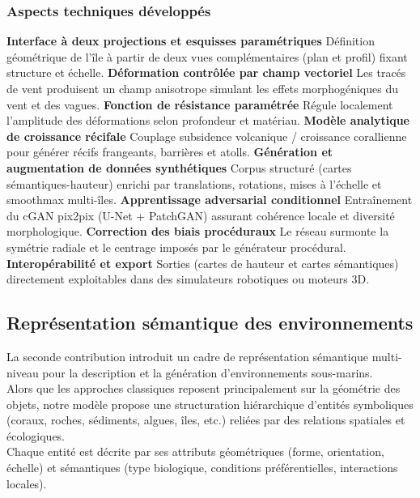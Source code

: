 \subsubsection*{Aspects techniques développés}
\begin{Itemize}
    \Item{} \textbf{Interface à deux projections et esquisses paramétriques} Définition géométrique de l'île à partir de deux vues complémentaires (plan et profil) fixant structure et échelle.
    \Item{} \textbf{Déformation contrôlée par champ vectoriel} Les tracés de vent produisent un champ anisotrope simulant les effets morphogéniques du vent et des vagues.
    \Item{} \textbf{Fonction de résistance paramétrée} Régule localement l'amplitude des déformations selon profondeur et matériau.
    \Item{} \textbf{Modèle analytique de croissance récifale} Couplage subsidence volcanique / croissance corallienne pour générer récifs frangeants, barrières et atolls.
    \Item{} \textbf{Génération et augmentation de données synthétiques} Corpus structuré (cartes sémantiques-hauteur) enrichi par translations, rotations, mises à l'échelle et smoothmax multi-îles.
    \Item{} \textbf{Apprentissage adversarial conditionnel} Entraînement du cGAN pix2pix (U-Net + PatchGAN) assurant cohérence locale et diversité morphologique.
    \Item{} \textbf{Correction des biais procéduraux} Le réseau surmonte la symétrie radiale et le centrage imposés par le générateur procédural.
    \Item{} \textbf{Interopérabilité et export} Sorties (cartes de hauteur et cartes sémantiques) directement exploitables dans des simulateurs robotiques ou moteurs 3D.
\end{Itemize}

\subsection*{Représentation sémantique des environnements}
La seconde contribution introduit un cadre de représentation sémantique multi-niveau pour la description et la génération d'environnements sous-marins. \\
Alors que les approches classiques reposent principalement sur la géométrie des objets, notre modèle propose une structuration hiérarchique d'entités symboliques (coraux, roches, sédiments, algues, îles, etc.) reliées par des relations spatiales et écologiques. \\
Chaque entité est décrite par ses attributs géométriques (forme, orientation, échelle) et sémantiques (type biologique, conditions préférentielles, interactions locales).

